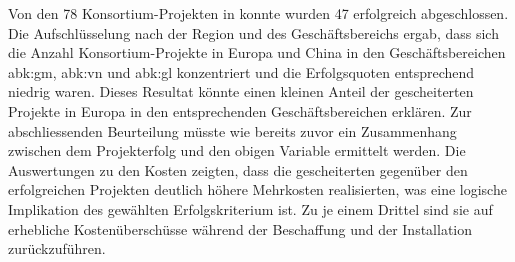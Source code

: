 \newline Von den 78 Konsortium-Projekten in konnte wurden 47 erfolgreich abgeschlossen. Die Aufschlüsselung nach der Region und des Geschäftsbereichs ergab, dass sich die Anzahl Konsortium-Projekte in Europa und China in den Geschäftsbereichen \gls{abk:gm}, \gls{abk:vn} und \gls{abk:gl} konzentriert und die Erfolgsquoten entsprechend niedrig waren. Dieses Resultat könnte einen kleinen Anteil der gescheiterten Projekte in Europa in den entsprechenden Geschäftsbereichen erklären. 
\newline Zur abschliessenden Beurteilung müsste wie bereits zuvor ein Zusammenhang zwischen dem Projekterfolg und den obigen Variable ermittelt werden.
\newline\newline
Die Auswertungen zu den Kosten zeigten, dass die gescheiterten gegenüber den erfolgreichen Projekten deutlich höhere Mehrkosten realisierten, was eine logische Implikation des gewählten Erfolgskriterium ist. Zu je einem Drittel sind sie auf erhebliche Kostenüberschüsse während der Beschaffung und der Installation zurückzuführen. 
